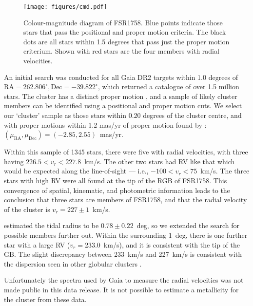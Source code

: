 \documentclass[fleqn,usenatbib,letters]{mnras}
\begin{document}
\begin{figure*}
\texttt{[image: figures/cmd.pdf]}
\caption{Colour-magnitude diagram of FSR1758. Blue points indicate those stars that pass the positional and proper motion criteria. The black dots are all stars within 1.5 degrees that pass just the proper motion criterium. Shown with red stars are the four members with radial velocities. \label{fig:cmd}}
\end{figure*}

An initial search was conducted for all Gaia DR2 targets within 1.0 degrees of $\mathrm{RA}=262.806^\circ, \mathrm{Dec}=-39.822^\circ$, which returned a catalogue of over 1.5 million stars. The cluster has a distinct proper motion \citep{Cantat-Gaudin2018, Barba2018}, and a sample of likely cluster members can be identified using a positional and proper motion cuts. We select our `cluster' sample as those stars within 0.20 degrees of the cluster centre, and with proper motions within 1.2 mas/yr of proper motion found by \citet{Barba2018}: $(\mu_\mathrm{RA},\mu_\mathrm{Dec})=(-2.85,2.55)$~mas/yr.

Within this sample of 1345 stars, there were five with radial velocities, with three having $226.5<v_r<227.8$~km/s. The other two stars had RV like that which would be expected along the line-of-sight --- i.e., $-100<v_r<75$~km/s. The three stars with high RV were all found at the tip of the RGB of FSR1758. This convergence of spatial, kinematic, and photometric information leads to the conclusion that three stars are members of FSR1758, and that the radial velocity of the cluster is $v_r=227\pm1$~km/s.

\citet{Barba2018} estimated the tidal radius to be $0.78\pm0.22$~deg, so we extended the search for possible members further out. Within the surrounding 1~deg, there is one further star with a large RV ($v_r=233.0$~km/s), and it is consistent with the tip of the GB. The slight discrepancy between 233~km/s and 227~km/s is consistent with the dispersion seen in other globular clusters \cite[e.g., $\omega$~Cen has a velocity dispersion of $\sim10$~km/s;][]{Johnson:2010fs}.

Unfortunately the spectra used by Gaia to measure the radial velocities was not made public in this data release. It is not possible to estimate a metallicity for the cluster from these data.

\end{document}
